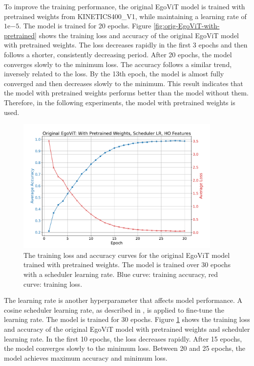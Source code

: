 To improve the training performance, the original EgoViT model is trained with pretrained weights from KINETICS400\_V1, while maintaining a learning rate of $1 \mathrm{e}{-5}$. The model is trained for 20 epochs. Figure \ref{fig:orig-EgoViT-with-pretrained} shows the training loss and accuracy of the original EgoViT model with pretrained weights. The loss decreases rapidly in the first 3 epochs and then follows a shorter, consistently decreasing period. After 20 epochs, the model converges slowly to the minimum loss. The accuracy follows a similar trend, inversely related to the loss. By the 13th epoch, the model is almost fully converged and then decreases slowly to the minimum. This result indicates that the model with pretrained weights performs better than the model without them. Therefore, in the following experiments, the model with pretrained weights is used.

\clearpage
\begin{figure}[htbp]
    \centering
    \includegraphics[width=0.9\textwidth]{graphics/figure21}
    \caption{The training loss and accuracy curves for the original EgoViT model trained with pretrained weights. The model is trained over 30 epochs with a scheduler learning rate. Blue curve: training accuracy, red curve: training loss.}
    \label{fig:orig-EgoViT-no-pretrained}
\end{figure}
\vspace{3mm}
The learning rate is another hyperparameter that affects model performance. A cosine scheduler learning rate, as described in \cite{liu_video_2021}, is applied to fine-tune the learning rate. The model is trained for 30 epochs. Figure \ref{fig:orig-EgoViT-no-pretrained} shows the training loss and accuracy of the original EgoViT model with pretrained weights and scheduler learning rate. In the first 10 epochs, the loss decreases rapidly. After 15 epochs, the model converges slowly to the minimum loss. Between 20 and 25 epochs, the model achieves maximum accuracy and minimum loss.

